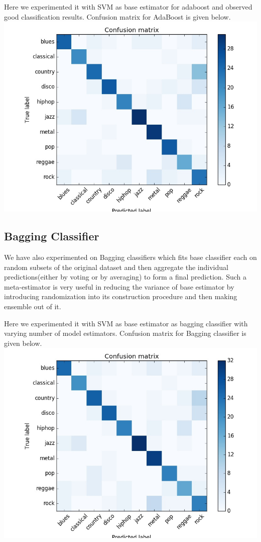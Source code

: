 \documentclass[conference]{IEEEtran}
\begin{document}
Here we experimented it with SVM as base estimator for adaboost and observed good classification results.
Confusion matrix for AdaBoost is given below.
\includegraphics[width=\columnwidth]{ADABOOST}

\subsection{Bagging Classifier}
\label{sub:Baagging Classification}
We have also experimented on Bagging classifiers which fits base classifier each on random subsets of the original dataset and then aggregate the individual predictions(either by voting or by averaging) to form a final prediction. Such a meta-estimator is very useful in reducing the variance of base estimator by introducing randomization into its construction procedure and then making ensemble out of it.

Here we experimented it with SVM as base estimator as bagging classifier with varying number of model estimators.
Confusion matrix for Bagging classifier is given below.
\includegraphics[width=\columnwidth]{BAGGING}
\end{document}
